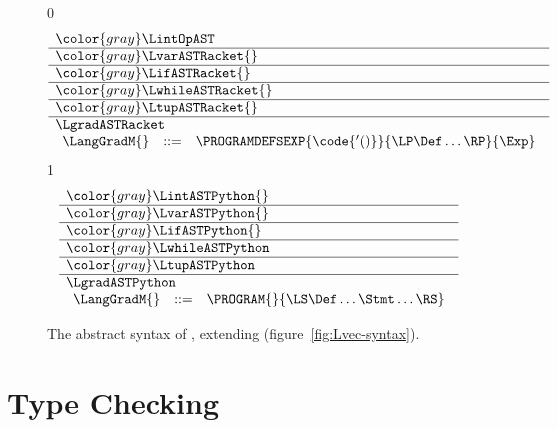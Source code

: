 \documentclass[7x10]{TimesAPriori_MIT}%
\newcommand{\gray}[1]{{\color{gray} #1}}
\def\racketEd{0}
\def\pythonEd{1}
\def\edition{1}
\newcommand{\pythonColor}[0]{}
\numberwithin{theorem}{chapter}
\numberwithin{definition}{chapter}
\numberwithin{equation}{chapter}
\begin{document}
\begin{figure}[tp]
\centering
\begin{tcolorbox}[colback=white]
    \small
{\if\edition\racketEd
\[
\begin{array}{l}
  \gray{\LintOpAST} \\ \hline
  \gray{\LvarASTRacket{}} \\ \hline
  \gray{\LifASTRacket{}} \\ \hline
  \gray{\LwhileASTRacket{}} \\ \hline
  \gray{\LtupASTRacket{}} \\ \hline
  \LgradASTRacket \\
\begin{array}{lcl}
  \LangGradM{} &::=& \PROGRAMDEFSEXP{\code{'()}}{\LP\Def\ldots\RP}{\Exp}
\end{array}
\end{array}
\]
\fi}
{\if\edition\pythonEd\pythonColor
\[
\begin{array}{l}
  \gray{\LintASTPython{}} \\ \hline
  \gray{\LvarASTPython{}} \\ \hline
  \gray{\LifASTPython{}} \\ \hline
  \gray{\LwhileASTPython} \\ \hline
  \gray{\LtupASTPython} \\   \hline
  \LgradASTPython \\
  \begin{array}{lcl}
    \LangGradM{} &::=& \PROGRAM{}{\LS \Def \ldots \Stmt \ldots \RS}
  \end{array}
\end{array}
\]
\fi}
\end{tcolorbox}

\caption{The abstract syntax of \LangGrad{}, extending \LangVec{} (figure~\ref{fig:Lvec-syntax}).}
\label{fig:Lgrad-syntax}
\end{figure}




\section{Type Checking \LangGrad{}}
\label{sec:gradual-type-check}
\end{document}
